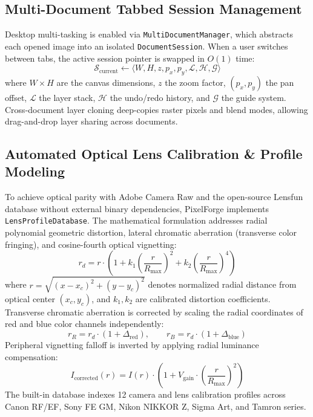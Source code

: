 \documentclass[10pt,journal,compsoc]{IEEEtran}
\begin{document}
\subsection{Multi-Document Tabbed Session Management}
Desktop multi-tasking is enabled via \texttt{MultiDocumentManager}, which abstracts each opened image into an isolated \texttt{DocumentSession}. When a user switches between tabs, the active session pointer is swapped in $O(1)$ time:
\begin{equation}
\mathcal{S}_{\text{current}} \longleftarrow \langle W, H, z, p_x, p_y, \mathcal{L}, \mathcal{H}, \mathcal{G} \rangle
\end{equation}
where $W \times H$ are the canvas dimensions, $z$ the zoom factor, $(p_x, p_y)$ the pan offset, $\mathcal{L}$ the layer stack, $\mathcal{H}$ the undo/redo history, and $\mathcal{G}$ the guide system. Cross-document layer cloning deep-copies raster pixels and blend modes, allowing drag-and-drop layer sharing across documents.

\subsection{Automated Optical Lens Calibration \& Profile Modeling}
To achieve optical parity with Adobe Camera Raw and the open-source Lensfun database without external binary dependencies, PixelForge implements \texttt{LensProfileDatabase}. The mathematical formulation addresses radial polynomial geometric distortion, lateral chromatic aberration (transverse color fringing), and cosine-fourth optical vignetting:
\begin{equation}
r_d = r \cdot \left(1 + k_1 \left(\frac{r}{R_{\max}}\right)^2 + k_2 \left(\frac{r}{R_{\max}}\right)^4\right)
\end{equation}
where $r = \sqrt{(x - x_c)^2 + (y - y_c)^2}$ denotes normalized radial distance from optical center $(x_c, y_c)$, and $k_1, k_2$ are calibrated distortion coefficients. Transverse chromatic aberration is corrected by scaling the radial coordinates of red and blue color channels independently:
\begin{equation}
r_R = r_d \cdot (1 + \Delta_{\text{red}}), \qquad r_B = r_d \cdot (1 + \Delta_{\text{blue}})
\end{equation}
Peripheral vignetting falloff is inverted by applying radial luminance compensation:
\begin{equation}
I_{\text{corrected}}(r) = I(r) \cdot \left(1 + V_{\text{gain}} \cdot \left(\frac{r}{R_{\max}}\right)^2\right)
\end{equation}
The built-in database indexes 12 camera and lens calibration profiles across Canon RF/EF, Sony FE GM, Nikon NIKKOR Z, Sigma Art, and Tamron series.
\end{document}
